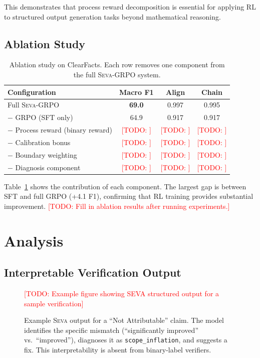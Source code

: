 \documentclass{article}
\newcommand{\seva}{\textsc{Seva}}
\newcommand{\todo}[1]{\textcolor{red}{[TODO: #1]}}
\newcommand{\realnumber}[1]{\textbf{#1}}
\begin{document}
This demonstrates that process reward decomposition is essential for applying RL to structured output generation tasks beyond mathematical reasoning.


\subsection{Ablation Study}

\begin{table}[t]
\centering
\caption{Ablation study on ClearFacts. Each row removes one component from the full \seva{}-GRPO system.}
\label{tab:ablation}
\small
\begin{tabular}{lccc}
\toprule
\textbf{Configuration} & \textbf{Macro F1} & \textbf{Align} & \textbf{Chain} \\
\midrule
Full \seva{}-GRPO & \realnumber{69.0} & 0.997 & 0.995 \\
\midrule
$-$ GRPO (SFT only) & 64.9 & 0.917 & 0.917 \\
$-$ Process reward (binary reward) & \todo{} & \todo{} & \todo{} \\
$-$ Calibration bonus & \todo{} & \todo{} & \todo{} \\
$-$ Boundary weighting & \todo{} & \todo{} & \todo{} \\
$-$ Diagnosis component & \todo{} & \todo{} & \todo{} \\
\bottomrule
\end{tabular}
\end{table}

Table~\ref{tab:ablation} shows the contribution of each component.
The largest gap is between SFT and full GRPO (+4.1 F1), confirming that RL training provides substantial improvement.
\todo{Fill in ablation results after running experiments.}


\section{Analysis}
\label{sec:analysis}

\subsection{Interpretable Verification Output}

\begin{figure}[t]
\centering
\todo{Example figure showing SEVA structured output for a sample verification}
\caption{Example \seva{} output for a ``Not Attributable'' claim. The model identifies the specific mismatch (``significantly improved'' vs.\ ``improved''), diagnoses it as \texttt{scope\_inflation}, and suggests a fix. This interpretability is absent from binary-label verifiers.}
\label{fig:example_output}
\end{figure}
\end{document}
